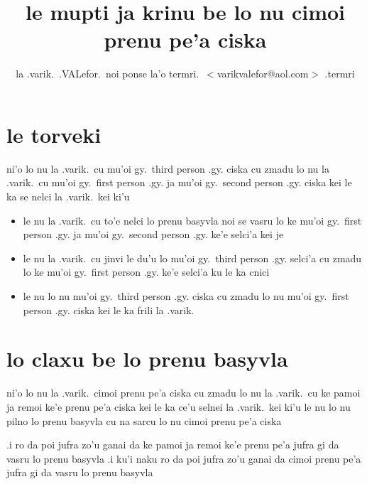 \documentclass{article}
\title{le mupti ja krinu be lo nu cimoi prenu pe'a ciska}
\author{la .varik.\ .VALefor.\ noi ponse la'o termri.\ $<$varikvalefor@aol.com$>$ .termri}
\begin{document}
\maketitle

\section{le torveki}
ni'o lo nu la .varik.\ cu mu'oi gy.\ third person .gy. ciska cu zmadu lo nu la .varik.\ cu mu'oi gy.\ first person .gy. ja mu'oi gy.\ second person .gy. ciska kei le ka se nelci la .varik.\ kei ki'u
\begin{itemize}
	\item le nu la .varik.\ cu to'e nelci lo prenu basyvla noi se vasru lo ke mu'oi gy.\ first person .gy. ja mu'oi gy.\ second person .gy. ke'e selci'a kei je
	\item le nu la .varik.\ cu jinvi le du'u lo mu'oi gy.\ third person .gy. selci'a cu zmadu lo ke mu'oi gy.\ first person .gy. ke'e selci'a ku le ka cnici
	\item le nu lo nu mu'oi gy.\ third person .gy. ciska cu zmadu lo nu mu'oi gy.\ first person .gy. ciska kei le ka frili la .varik.
\end{itemize}

\section{lo claxu be lo prenu basyvla}
ni'o lo nu la .varik.\ cimoi prenu pe'a ciska cu zmadu lo nu la .varik.\ cu ke pamoi ja remoi ke'e prenu pe'a ciska kei le ka ce'u selnei la .varik.\ kei ki'u le nu lo nu pilno lo prenu basyvla cu na sarcu lo nu cimoi prenu pe'a ciska

.i ro da poi jufra zo'u ganai da ke pamoi ja remoi ke'e prenu pe'a jufra gi da vasru lo prenu basyvla  .i ku'i naku ro da poi jufra zo'u ganai da cimoi prenu pe'a jufra gi da vasru lo prenu basyvla
\end{document}
